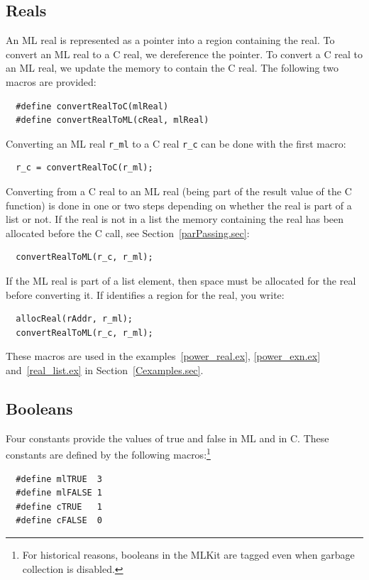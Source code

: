 \documentclass[12pt]{book}
\begin{document}
\subsection{Reals}
An ML real is represented as a pointer into a region containing the
real. To convert an ML real to a C real, we dereference the pointer. To
convert a C real to an ML real, we update the memory to contain the C
real. The following two macros are provided:
%
%
\begin{verbatim}
  #define convertRealToC(mlReal)
  #define convertRealToML(cReal, mlReal)
\end{verbatim}

Converting an ML real \verb|r_ml| to a C real \verb|r_c| can be done with the first macro:
\begin{verbatim}
  r_c = convertRealToC(r_ml);
\end{verbatim}

Converting from a C real to an ML real (being part of the result value of the
C function) is done in one or two steps depending on whether the real is
part of a list or not. If the real is not in a list the memory containing
the real has been allocated before the C call, see Section~\ref{parPassing.sec}:
\begin{verbatim}
  convertRealToML(r_c, r_ml);
\end{verbatim}
If the ML real is part of a list element, then space must be allocated for
the real before converting it. If  identifies a region
for the real, you write:
%
\begin{verbatim}
  allocReal(rAddr, r_ml);
  convertRealToML(r_c, r_ml);
\end{verbatim}

These macros are used in the examples~\ref{power_real.ex},
\ref{power_exn.ex} and~\ref{real_list.ex} in
Section~\ref{Cexamples.sec}.

\subsection{Booleans}
Four constants provide the values of true and false in ML and in C.
These constants are defined by the following macros:\footnote{For
  historical reasons, booleans in the MLKit are tagged even when garbage
  collection is disabled.}
%
%
%
%
\begin{verbatim}
  #define mlTRUE  3
  #define mlFALSE 1
  #define cTRUE   1
  #define cFALSE  0
\end{verbatim}
\end{document}
